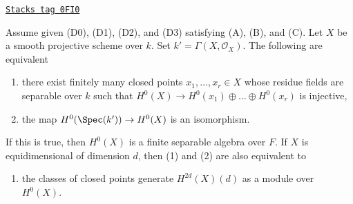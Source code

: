 \begin{lemma}[H 0 separable]
\label{weil-lemma-H-0-separable}
\href{https://stacks.math.columbia.edu/tag/0FI0}{\texttt{Stacks tag 0FI0}}

Assume given (D0), (D1), (D2), and (D3) satisfying (A), (B), and (C).
Let $X$ be a smooth projective scheme over $k$.
Set $k' = \Gamma(X, \mathcal{O}_X)$. The following are equivalent
\begin{enumerate}
\item there exist finitely many closed points $x_1, \ldots, x_r \in X$
whose residue fields are separable over $k$ such that
$H^0(X) \to H^0(x_1) \oplus \ldots \oplus H^0(x_r)$ is injective,
\item the map $H^0(\Spec(k')) \to H^0(X)$ is an isomorphism.
\end{enumerate}
If this is true, then $H^0(X)$ is a finite separable algebra over $F$.
If $X$ is equidimensional of dimension $d$, then (1) and (2)
are also equivalent to
\begin{enumerate}
\item[(3)] the classes of closed points generate $H^{2d}(X)(d)$
as a module over $H^0(X)$.
\end{enumerate}
\end{lemma}

